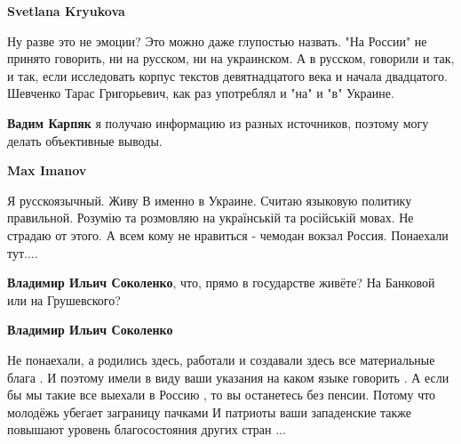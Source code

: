 \begin{itemize}
\begin{itemize}
\textbf{Svetlana Kryukova} 

Ну разве это не эмоции? Это можно даже глупостью назвать. "На России" не
принято говорить, ни на русском, ни на украинском. А в русском, говорили и так,
и так, если исследовать корпус текстов девятнадцатого века и начала двадцатого.
Шевченко Тарас Григорьевич, как раз употреблял и "на" и "в" Украине.

 
\textbf{Вадим Карпяк} я получаю информацию из разных источников, поэтому могу делать объективные выводы.

 
\textbf{Max Imanov} 

Я русскоязычный. Живу В именно в Украине. Считаю языковую политику правильной.
Розумію та розмовляю на українській та російській мовах. Не страдаю от этого. А
всем кому не нравиться - чемодан вокзал Россия. Понаехали тут....

 
\textbf{Владимир Ильич Соколенко}, что, прямо в государстве живёте? На Банковой или на Грушевского?

 
\textbf{Владимир Ильич Соколенко} 

Не понаехали, а родились здесь, работали и создавали здесь все материальные
блага . И поэтому имели в виду ваши указания на каком языке говорить . А если
бы мы такие все выехали в Россию , то вы останетесь без пенсии. Потому что
молодёжь убегает заграницу пачками И патриоты ваши западенские также повышают
уровень благосостояния других стран ...


 

\end{itemize}
\end{itemize}
